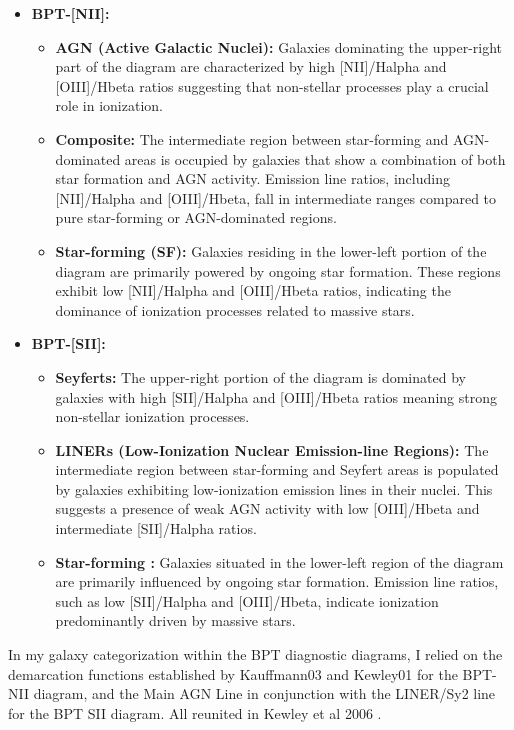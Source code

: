 \begin{itemize}
    \item \textbf{BPT-[NII]:}
		\begin{itemize}
    		 \item \textbf{AGN (Active Galactic Nuclei):} Galaxies dominating the upper-right part of the diagram are characterized by high [NII]/Halpha and [OIII]/Hbeta ratios suggesting that non-stellar processes play a crucial role in ionization.
		  \item \textbf{Composite:} The intermediate region between star-forming and AGN-dominated areas is occupied by galaxies that show a combination of both star formation and AGN activity. Emission line ratios, including [NII]/Halpha and [OIII]/Hbeta, fall in intermediate ranges compared to pure star-forming or AGN-dominated regions.
		\item \textbf{Star-forming (SF):} Galaxies residing in the lower-left portion of the diagram are primarily powered by ongoing star formation. These regions exhibit low [NII]/Halpha and [OIII]/Hbeta ratios, indicating the dominance of ionization processes related to massive stars.

		\end{itemize}

		\item \textbf{BPT-[SII]:}
		\begin{itemize}
    		\item \textbf{Seyferts:} The upper-right portion of the diagram is dominated by galaxies with high [SII]/Halpha and [OIII]/Hbeta ratios meaning strong non-stellar ionization processes.
    		\item \textbf{LINERs (Low-Ionization Nuclear Emission-line Regions):} The intermediate region between star-forming and Seyfert areas is populated by galaxies exhibiting low-ionization emission lines in their nuclei. This suggests a presence of weak AGN activity with low [OIII]/Hbeta and intermediate [SII]/Halpha ratios.
		 \item \textbf{Star-forming :} Galaxies situated in the lower-left region of the diagram are primarily influenced by ongoing star formation. Emission line ratios, such as low [SII]/Halpha and [OIII]/Hbeta, indicate ionization predominantly driven by massive stars.
		\end{itemize}

\end{itemize}

In my galaxy categorization within the BPT diagnostic diagrams, I relied on the demarcation functions established by Kauffmann03 \cite{2003MNRAS.346.1055K} and Kewley01 \cite{2001ApJ...556..121K} for the BPT-NII diagram, and the Main AGN Line in conjunction with the LINER/Sy2 line for the BPT SII diagram. All reunited in Kewley et al 2006 \cite{2006MNRAS.372..961K}.

